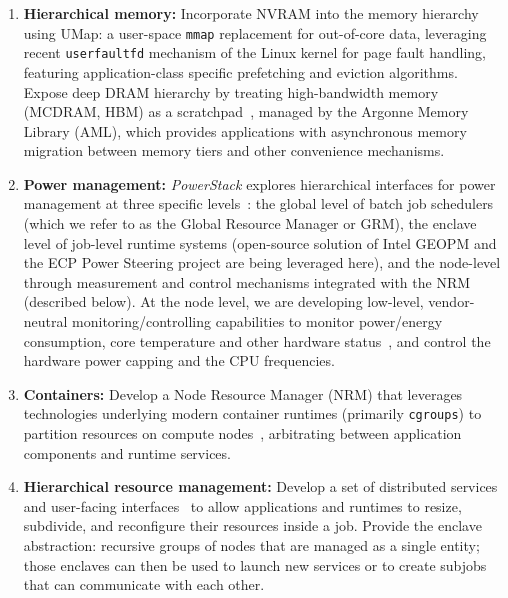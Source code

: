 \begin{enumerate}

\item \textbf{Hierarchical memory:} Incorporate NVRAM into the memory hierarchy
using UMap: a user-space \texttt{mmap} replacement for out-of-core data,
leveraging recent \texttt{userfaultfd} mechanism of the Linux kernel for page fault
handling, featuring application-class specific prefetching and eviction
algorithms.  Expose deep DRAM hierarchy by treating high-bandwidth memory
(MCDRAM, HBM) as a scratchpad~\cite{perarnau2016exploring}, managed by the Argonne Memory Library (AML),
which provides applications with asynchronous memory migration
between memory tiers and other convenience mechanisms.

\item \textbf{Power management:}
\emph{PowerStack} explores hierarchical interfaces for power management
at three specific
levels~\cite{Ellsworth:argo,ellsworth_e2sc2016,patki2016,sakamoto2017}: the
global level of batch job schedulers (which we refer to as the Global
Resource Manager or GRM), the enclave level of job-level runtime systems
(open-source solution of Intel GEOPM and the ECP Power Steering project
are being leveraged here), and the node-level through measurement and control
mechanisms integrated with the NRM (described below).
At the node level, we are developing low-level, vendor-neutral
monitoring/controlling capabilities to monitor power/energy consumption,
core temperature and other hardware status~\cite{osti_1353371,zhang2015minimizing}, and control the hardware power
capping and the CPU frequencies. 

\item \textbf{Containers:} Develop a Node Resource Manager (NRM) that leverages
technologies underlying modern container runtimes
(primarily \texttt{cgroups}) to partition resources on compute nodes~\cite{zounmevo2015container},
arbitrating between application components and runtime services.

\item \textbf{Hierarchical resource management:} Develop a set of distributed
services and user-facing interfaces~\cite{perarnau2015distributed} to allow applications and runtimes to
resize, subdivide, and reconfigure their resources inside a job.  Provide
the enclave abstraction: recursive groups of nodes that are managed as a
single entity; those enclaves can then be used to launch new services or to
create subjobs that can communicate with each other.
\end{enumerate}


